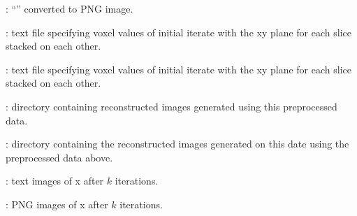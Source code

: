 \begin{tcbfunctionenv}
\begin{tcbparagraph}
\begin{deepList}[labelindent=1pt, leftmargin=*]
\begin{deepList}[labelindent=1pt, leftmargin=*]
\begin{deepList}[labelindent=1pt, leftmargin=*]
\begin{deepList}[labelindent=1pt, leftmargin=*]
\begin{deepList}[labelindent=1pt, leftmargin=*]
\begin{deepList}[labelindent=1pt, leftmargin=*]
\begin{deepList}[labelindent=1pt, leftmargin=*]
\begin{deepList}[labelindent=1pt, leftmargin=*]
\begin{deepList}[labelindent=1pt, leftmargin=*]
                                        \item {} : ``'' converted to PNG image.
                                        \item {} : text file specifying voxel values of initial iterate with the xy plane for each slice stacked on each other.
                                        \item {} : text file specifying voxel values of initial iterate with the xy plane for each slice stacked on each other.
                                        \item {} : directory containing reconstructed images generated using this preprocessed data.
                                        \begin{deepList}[labelindent=1pt, leftmargin=*]
                                            \item {} : directory containing the reconstructed images generated on this date using the preprocessed data above.
                                                \begin{deepList}[labelindent=1pt, leftmargin=*]
                                                    \item {} : text images of x after $k$ iterations.
                                                    \item {} : PNG images of x after $k$ iterations.
                                                \end{deepList}
                                        \end{deepList}
                                    \end{deepList}

\end{deepList}
\end{deepList}
\end{deepList}
\end{deepList}
\end{deepList}
\end{deepList}
\end{deepList}
\end{deepList}
\end{tcbparagraph}
\end{tcbfunctionenv}
